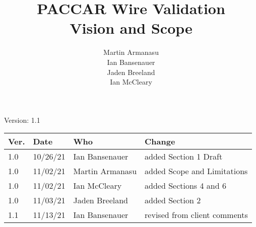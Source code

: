 \documentclass[letterpaper,12pt]{article}
\title{PACCAR Wire Validation\\Vision and Scope}
\author{Martin Armanasu\\Ian Bansenauer\\Jaden Breeland\\Ian McCleary}
\begin{document}
\maketitle

\begin{center}
  Version: 1.1
\end{center}

\vfill
\begin{tabularx}{\linewidth}{|l|l|l|X|}\hline
Ver. & Date & Who & Change \\\hline
1.0  &10/26/21&  Ian Bansenauer   &  added Section 1 Draft \\\hline
1.0  &11/02/21&Martin Armanasu&added Scope and Limitations \\\hline
1.0  &11/02/21&Ian McCleary&added Sections 4 and 6 \\\hline
1.0  &11/03/21&Jaden Breeland&added Section 2 \\\hline
1.1 & 11/13/21& Ian Bansenauer& revised from client comments\\\hline
\end{tabularx}
\newpage







\end{document}

